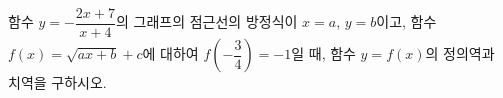 함수 $y=-\dfrac{2x+7}{x+4}$의 그래프의 점근선의 방정식이 $x=a$, $y=b$이고, 함수 $f(x)=\sqrt{ax+b}+c$에 대하여 $f\left(-\dfrac{3}{4}\right)=-1$일 때, 함수 $y=f(x)$의 정의역과 치역을 구하시오. 

